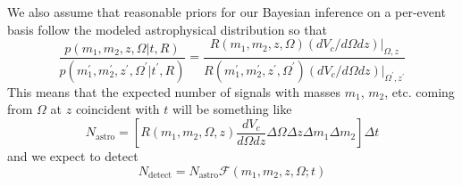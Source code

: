 \documentclass{article}
\begin{document}
\vspace{0.5cm}
\noindent
We also assume that reasonable priors for our Bayesian inference on a per-event basis follow the modeled astrophysical distribution so that
\begin{equation}
    \frac{p(m_1, m_2, z, \Omega|t,R)}{p(m_1^\prime, m_2^\prime, z^\prime, \Omega^\prime|t^\prime,R)} = \frac{R(m_1, m_2, z, \Omega) \left.(dV_c/d\Omega dz)\right|_{\Omega, z}}{R(m_1^\prime, m_2^\prime, z^\prime, \Omega^\prime) \left.(dV_c/d\Omega dz)\right|_{\Omega^\prime, z^\prime}}
\end{equation}
This means that the expected number of signals with masses $m_1$, $m_2$, etc. coming from $\Omega$ at $z$ coincident with $t$ will be something like 
\begin{equation}
    N_\mathrm{astro} = \left[ R(m_1, m_2, \Omega, z) \frac{dV_c}{d\Omega dz} \Delta\Omega \Delta z \Delta m_1 \Delta m_2 \right] \Delta t
\end{equation}
and we expect to detect 
\begin{equation}
    N_\mathrm{detect} = N_\mathrm{astro} \mathcal{F}(m_1, m_2, z, \Omega; t)
\end{equation}
\end{document}
